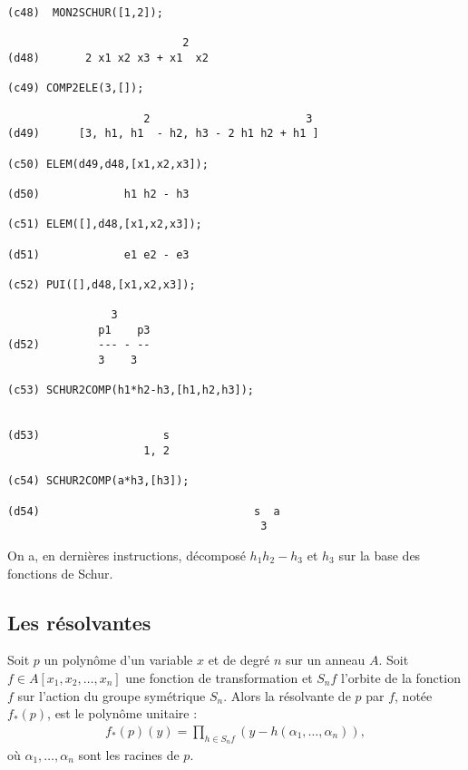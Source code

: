 \documentclass[11pt]{article}
\begin{document}
\begin{verbatim}
(c48)  MON2SCHUR([1,2]);

                           2
(d48)       2 x1 x2 x3 + x1  x2

(c49) COMP2ELE(3,[]);

                     2                        3
(d49)      [3, h1, h1  - h2, h3 - 2 h1 h2 + h1 ]

(c50) ELEM(d49,d48,[x1,x2,x3]);

(d50)             h1 h2 - h3

(c51) ELEM([],d48,[x1,x2,x3]);

(d51)             e1 e2 - e3

(c52) PUI([],d48,[x1,x2,x3]);

                3
              p1    p3
(d52)         --- - --
              3    3

(c53) SCHUR2COMP(h1*h2-h3,[h1,h2,h3]);


(d53) 				    s	  
				     1, 2

(c54) SCHUR2COMP(a*h3,[h3]);

(d54)                                 s  a
                                       3

\end{verbatim}
\normalsize
On a, en derni\`eres instructions, d\'ecompos\'e $h_{1}h_{2}-h_{3}$ 
et $h_{3}$ sur la base des fonctions de Schur.
\subsection{Les r\'esolvantes}
  Soit $p$ un polyn\^ome d'un variable $x$ et de degr\'e $n$ sur un
anneau $A$.
Soit $f \in A[x_1,x_2,\ldots ,x_n]$ une fonction de transformation et
$S_nf$ l'orbite de la fonction $f$ sur l'action du groupe sym\'etrique
$S_n$. Alors la r\'esolvante de $p$ par $f$, not\'ee $f_*(p)$,
est le polyn\^ome unitaire :
\begin{eqnarray*}
f_*(p)(y) = \prod_{h\in S_nf} (y- h(\alpha_1,\ldots ,\alpha_n)),
\end{eqnarray*}
o\`u $\alpha_1,\ldots ,\alpha_n$ sont les racines de $p$.\\
\end{document}
